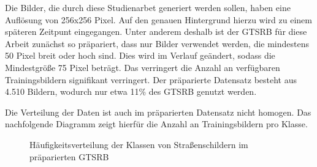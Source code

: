 Die Bilder, die durch diese Studienarbet generiert werden sollen, haben eine Auflösung von 256x256 Pixel. Auf den genauen Hintergrund hierzu wird zu einem späteren Zeitpunt eingegangen. Unter anderem deshalb ist der \ac{GTSRB} für diese Arbeit zunächst so präpariert, dass nur Bilder verwendet werden, die mindestens 50 Pixel breit oder hoch sind. Dies wird im Verlauf geändert, sodass die Mindestgröße 75 Pixel beträgt. Das verringert die Anzahl an verfügbaren Trainingsbildern signifikant verringert. Der präparierte Datensatz besteht aus 4.510 Bildern, wodurch nur etwa 11\% des \ac{GTSRB} genutzt werden.

Die Verteilung der Daten ist auch im präparierten Datensatz nicht homogen. Das nachfolgende Diagramm zeigt hierfür die Anzahl an Trainingsbildern pro Klasse.


\begin{figure}[H]
\centering
{}
\caption{Häufigkeitsverteilung der Klassen von Straßenschildern im präparierten \ac{GTSRB}}
\end{figure}


